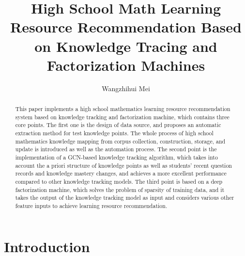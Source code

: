 \documentclass[11pt,en]{elegantpaper}
\title{High School Math Learning Resource Recommendation Based on Knowledge Tracing and Factorization Machines}
\author{Wangzhihui Mei}
\institute{CCNU-JI}
\date{}
\begin{document}
\maketitle

\begin{abstract}
	This paper implements a high school mathematics learning resource recommendation system based on knowledge tracking and factorization machine, which contains three core points. The first one is the design of data source, and proposes an automatic extraction method for test knowledge points. The whole process of high school mathematics knowledge mapping from corpus collection, construction, storage, and update is introduced as well as the automation process. The second point is the implementation of a GCN-based knowledge tracking algorithm, which takes into account the a priori structure of knowledge points as well as students' recent question records and knowledge mastery changes, and achieves a more excellent performance compared to other knowledge tracking models. The third point is based on a deep factorization machine, which solves the problem of sparsity of training data, and it takes the output of the knowledge tracking model as input and considers various other feature inputs to achieve learning resource recommendation.
\end{abstract}


\section{Introduction}
\end{document}
